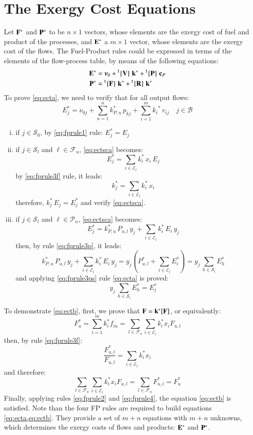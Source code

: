 \documentclass{ecos}
\begin{document}
\section{The Exergy Cost Equations}
Let $\mathbf{F}^*$ and $\mathbf{P}^*$ to be $n\times1$ vectors, whose elements are the exergy cost of fuel and product of the processes, and $\mathbf{E}^*$ a $m\times1$ vector, whose elements are the exergy cost of the flows.
The Fuel-Product rules could be expressed in terms of the elements of the flow-process table, by means of the following equations:
\begin{align}
\mathbf{E}^{*}&=\bm{\nu}_0+\prescript{\smash{\mathsf{t}}}{}{\mskip-1mu}\left[ \textbf{V} \right]\,\mathbf{k}^{*}+\prescript{\smash{\mathsf{t}}}{}{\mskip-1mu}\left[ \textbf{P} \right]\,\mathbf{c}_P \label{eq:ecta}\\
\mathbf{P}^{*}&= \prescript{\smash{\mathsf{t}}}{}{\mskip-1mu}\left[ \textbf{F} \right]\,\mathbf{k}^{*}+ \prescript{\smash{\mathsf{t}}}{}{\mskip-1mu}\left[ \textbf{R} \right]\,\mathbf{k}^{*} \label{eq:ectb}
\end{align}
To prove \cref{eq:ecta}, we need to verify that for all output flows:
\begin{equation}
\label{eq:ectsca}
E_{j}^{*}=\nu_{0j}+\sum_{u=1}^{n}{k_{P,u}^{*}\,p_{kj}+\sum_{i=1}^{m}{k_{i}}^{*}\,v_{ij}} \quad j\in\mathcal{B}
\end{equation}
\begin{enumerate}[i)]
	\item if $j\in\mathcal{S}_0$, by \ref{eq:fprule1} rule: $E_j^*=E_j$
	\item if $j\in\mathcal{S}_l$ and $\ell\in\mathcal{F}_u$, \cref{eq:ectsca} becomes:
	\[
	E_j^*=\sum_{i\in\mathcal{E}_l}{k_i^*\,x_i\,E_j}
	\]
	by \ref{eq:fprule3f} rule, it leads:
	\[
	k_j^*=\sum_{i\in\mathcal{E}_l}{k_i^*\,x_i}
	\]
	therefore, $k_j^*\,E_j=E_j^*$ and verify \cref{eq:ectsca}.
	\item if $j\in\mathcal{S}_l$ and $\ell\in\mathcal{P}_u$, \cref{eq:ectsca} becomes:
	\[
	E_j^*=k_{P,u}^*\,P_{u,l}\,y_j+\sum_{i\in\mathcal{E}_l}{k_i^*\,E_i\,y_j} 
	\]
	then, by rule \ref{eq:fprule3p}, it leads:
	\[
	k_{P,u}^*\,P_{u,l}\,y_j+\sum_{i\in\mathcal{E}_l}{k_i^*\,E_i\,y_j}=
	y_j\left(P_{u,l}^{*}+\sum_{i\in\mathcal{E}_l}{E_i^*}\right)=y_j\,\sum_{h\in\mathcal{S}_l}{E_h^*}
	\]
	and applying \ref{eq:fprule3ps} rule \cref{eq:ecta} is proved:
	\[
	y_j\,\sum_{h\in\mathcal{S}_l}{E_h^*}=E_j^*
	\]
\end{enumerate}
To demonstrate \cref{eq:ectb}, first, we prove that $\mathbf{F}=\mathbf{k}^*[\mathbf{F}]$, or equivalently:
\begin{equation}
F_u^*=\sum_{i=1}^{m}{k_i^* f_{iu}}=\sum_{l\in\mathcal{F}_u}{\sum_{i\in\mathcal{E}_l}{k_i^* x_i F_{u,l}}}
\end{equation}
then, by rule \ref{eq:fprule3f}:
\[
\frac{F_{u,l}^*}{F_{u,l}}=\sum_{i\in\mathcal{E}_l}{k_i^*x_i}
\]
and therefore:
\[
\sum_{l\in\mathcal{F}_u}{\sum_{i\in\mathcal{E}_l}{k_i^* x_i F_{u,l}}=\sum_{l\in\mathcal{F}_u}{F_{u,l}^*}}=F_u^*
\]
Finally, applying rules \ref{eq:fprule2} and \ref{eq:fprule4}, the equation \eqref{eq:ectb} is satisfied.
Note than the four FP rules are required to build equations \cref{eq:ecta,eq:ectb}. They provide a set of $m+n$ equations with $m+n$ unknowns, which determines the exergy costs of flows and products: $\mathbf{E}^*$ and $\mathbf{P}^*$.
\end{document}
